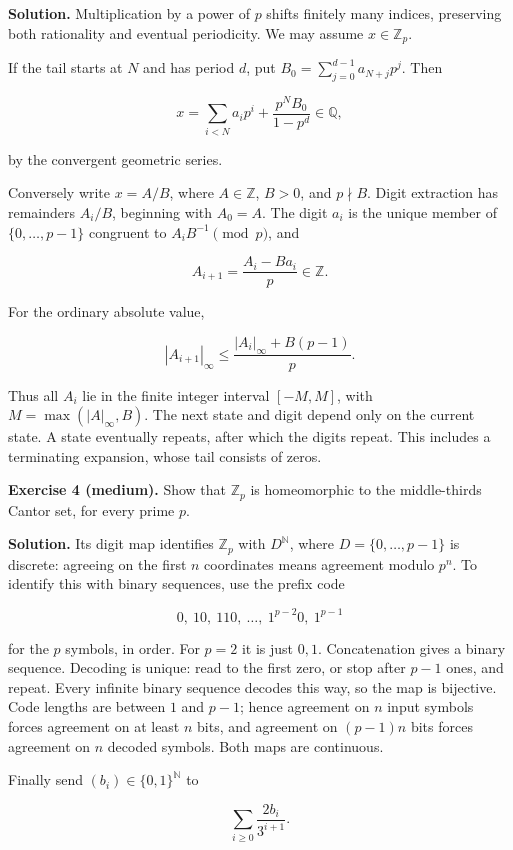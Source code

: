 \documentclass[
  english,
  11pt,
  a4paper,
]{article}
\begin{document}
\textbf{Solution.} Multiplication by a power of \(p\) shifts finitely
many indices, preserving both rationality and eventual periodicity. We
may assume \(x\in\mathbb Z_p\).

If the tail starts at \(N\) and has period \(d\), put
\(B_0=\sum_{j=0}^{d-1}a_{N+j}p^j\). Then

\[x=\sum_{i<N}a_ip^i+\frac{p^NB_0}{1-p^d}\in\mathbb Q,\]

by the convergent geometric series.

Conversely write \(x=A/B\), where \(A\in\mathbb Z\), \(B>0\), and
\(p\nmid B\). Digit extraction has remainders \(A_i/B\), beginning with
\(A_0=A\). The digit \(a_i\) is the unique member of
\(\{0,\ldots,p-1\}\) congruent to \(A_iB^{-1}\pmod p\), and

\[A_{i+1}=\frac{A_i-Ba_i}{p}\in\mathbb Z.\]

For the ordinary absolute value,

\[|A_{i+1}|_\infty\le\frac{|A_i|_\infty+B(p-1)}p.\]

Thus all \(A_i\) lie in the finite integer interval \([-M,M]\), with
\(M=\max(|A|_\infty,B)\). The next state and digit depend only on the
current state. A state eventually repeats, after which the digits
repeat. This includes a terminating expansion, whose tail consists of
zeros.

\textbf{Exercise 4 (medium).} Show that \(\mathbb Z_p\) is homeomorphic
to the middle-thirds Cantor set, for every prime \(p\).

\textbf{Solution.} Its digit map identifies \(\mathbb Z_p\) with
\(D^{\mathbb N}\), where \(D=\{0,\ldots,p-1\}\) is discrete: agreeing on
the first \(n\) coordinates means agreement modulo \(p^n\). To identify
this with binary sequences, use the prefix code

\[0,\ 10,\ 110,\ \ldots,\ 1^{p-2}0,\ 1^{p-1}\]

for the \(p\) symbols, in order. For \(p=2\) it is just \(0,1\).
Concatenation gives a binary sequence. Decoding is unique: read to the
first zero, or stop after \(p-1\) ones, and repeat. Every infinite
binary sequence decodes this way, so the map is bijective. Code lengths
are between \(1\) and \(p-1\); hence agreement on \(n\) input symbols
forces agreement on at least \(n\) bits, and agreement on \((p-1)n\)
bits forces agreement on \(n\) decoded symbols. Both maps are
continuous.

Finally send \((b_i)\in\{0,1\}^{\mathbb N}\) to

\[\sum_{i\ge0}\frac{2b_i}{3^{i+1}}.\]
\end{document}
